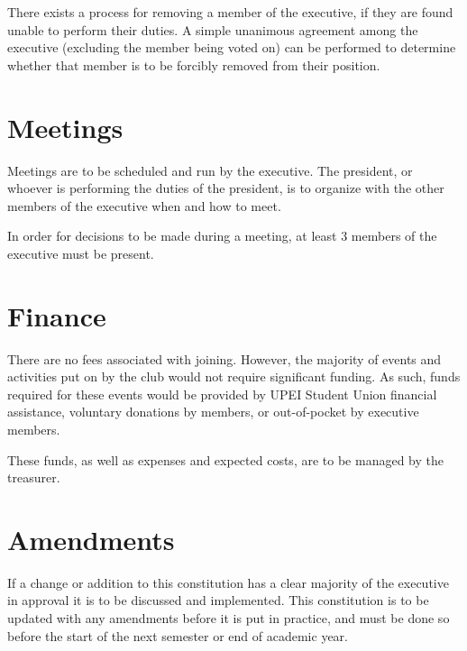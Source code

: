 \documentclass[11pt]{article}
\begin{document}
\vspace{2mm}
\noindent
There exists a process for removing a member of the executive, if they are found unable to perform their duties. A simple unanimous agreement among the executive (excluding the member being voted on) can be performed to determine whether that member is to be forcibly removed from their position.

\section{Meetings}

Meetings are to be scheduled and run by the executive. The president, or whoever is performing the duties of the president, is to organize with the other members of the executive when and how to meet.

\vspace{2mm}
\noindent
In order for decisions to be made during a meeting, at least 3 members of the executive must be present.

\section{Finance}

There are no fees associated with joining. However, the majority of events and activities put on by the club would not require significant funding. As such, funds required for these events would be provided by UPEI Student Union financial assistance, voluntary donations by members, or out-of-pocket by executive members.

\vspace{2mm}
\noindent
These funds, as well as expenses and expected costs, are to be managed by the treasurer.

\section{Amendments}

If a change or addition to this constitution has a clear majority of the executive in approval it is to be discussed and implemented. This constitution is to be updated with any amendments before it is put in practice, and must be done so before the start of the next semester or end of academic year.
\end{document}
